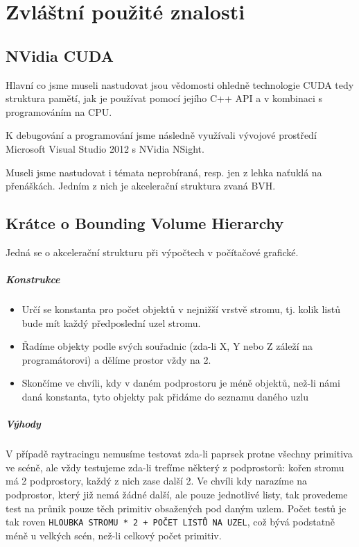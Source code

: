 \documentclass[12pt,a4paper,titlepage,final]{report}
\begin{document}
\chapter{Zvláštní použité znalosti}

\section{NVidia CUDA}
Hlavní co jsme museli nastudovat jsou vědomosti ohledně technologie CUDA tedy struktura pamětí, jak je používat pomocí jejího C++ API a v kombinaci s programováním na CPU.

K debugování a programování jsme následně využívali vývojové prostředí Microsoft Visual Studio 2012 s NVidia NSight.

Museli jsme nastudovat i témata neprobíraná, resp. jen z lehka naťuklá na přenáškách. Jedním z nich je akcelerační struktura zvaná BVH.

\section{Krátce o Bounding Volume Hierarchy}
Jedná se o akcelerační strukturu při výpočtech v počítačové grafické.

\paragraph{Konstrukce}
\begin{itemize}
	\item Určí se konstanta pro počet objektů v nejnižší vrstvě stromu, tj. kolik listů bude mít každý předposlední uzel stromu.
	\item Řadíme objekty podle svých souřadnic (zda-li X, Y nebo Z záleží na programátorovi) a dělíme prostor vždy na 2.
	\item Skončíme ve chvíli, kdy v daném podprostoru je méně objektů, než-li námi daná konstanta, tyto objekty pak přidáme do seznamu daného uzlu
\end{itemize}

\paragraph{Výhody} V případě raytracingu nemusíme testovat zda-li paprsek protne všechny primitiva ve scéně, ale vždy testujeme zda-li trefíme některý z podprostorů: kořen stromu má 2 podprostory, každý z nich zase další 2. Ve chvíli kdy narazíme na podprostor, který již nemá žádné další, ale pouze jednotlivé listy, tak provedeme test na průnik pouze těch primitiv obsažených pod daným uzlem. Počet testů je tak roven \verb|HLOUBKA STROMU * 2 + POČET LISTŮ NA UZEL|, což bývá podstatně méně u velkých scén, než-li celkový počet primitiv.
\end{document}
